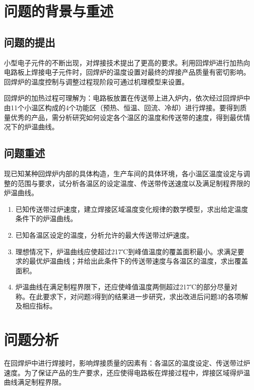 \documentclass[withoutpreface,bwprint]{cumcmthesis} %
\numberwithin{equation}{subsection}
\begin{document}
\section{问题的背景与重述}

\subsection{问题的提出}
小型电子元件的不断出现，对焊接技术提出了更高的要求。利用回焊炉进行加热向电路板上焊接电子元件时，回焊炉的温度设置对最终的焊接产品质量有密切影响。回焊炉的温度控制与调整过程现阶段可通过机理模型来设置。

回焊炉的加热过程可理解为：电路板放置在传送带上进入炉内，依次经过回焊炉中由11个小温区构成的4个功能区（预热、恒温、回流、冷却）进行焊接。要得到质量优秀的产品，需分析研究如何设定各个温区的温度和传送带的速度，得到最优情况下的炉温曲线。

\subsection{问题重述}
现已知某种回焊炉内部的具体构造，生产车间的具体环境，各小温区温度设定与调整的范围与要求，试分析各温区的设定温度、传送带传送速度以及满足制程界限的炉温曲线。

\begin{enumerate}[label=(\arabic*)]
\item  已知传送带过炉速度，建立焊接区域温度变化规律的数学模型，求出给定温度条件下的炉温曲线。
	
\item  已知各温区设定的温度，分析允许的最大传送带过炉速度。
	
\item  理想情况下，炉温曲线应使超过217℃到峰值温度的覆盖面积最小。求满足要求的最优炉温曲线；并给出此条件下的传送带速度与各温区的温度，求出覆盖面积。
	
\item 炉温曲线在满足制程界限下，还应使峰值温度两侧超过217℃的部分尽量对称。在此要求下，对问题3得到的结果进一步研究，求出改进后问题3的各项解及相应指标。
\end{enumerate}




\section{问题分析}
在回焊炉中进行焊接时，影响焊接质量的因素有：各温区的温度设定、传送带过炉速度。为了保证产品的生产要求，还应使得电路板在焊接过程中，焊接区域得炉温曲线满足制程界限。
\end{document}
